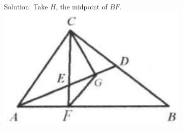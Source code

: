 \documentclass[10pt]{article}
\begin{document}
Solution:
Take \(H\), the midpoint of \(B F\).\\
\includegraphics[max width=\textwidth, center]{2025_04_17_97bc1f7e44d93c271a88g-040(1)}
\end{document}
